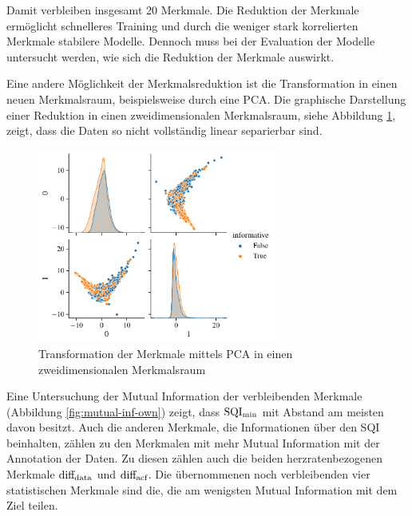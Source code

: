 Damit verbleiben insgesamt 20 Merkmale. Die Reduktion der Merkmale ermöglicht schnelleres Training und durch die weniger stark korrelierten Merkmale stabilere Modelle. Dennoch muss bei der Evaluation der Modelle untersucht werden, wie sich die Reduktion der Merkmale auswirkt.

Eine andere Möglichkeit der Merkmalsreduktion ist die Transformation in einen neuen Merkmalsraum, beispielsweise durch eine \ac{PCA}. Die graphische Darstellung einer Reduktion in einen zweidimensionalen Merkmalsraum, siehe Abbildung \ref{fig:pca-own-reduced}, zeigt, dass die Daten so nicht vollständig linear separierbar sind.

\begin{figure}[H] %
	\centering
	\includegraphics[width=0.7\textwidth]{pic/pca-own-reduced.pdf}
	\caption{Transformation der Merkmale mittels PCA in einen zweidimensionalen Merkmalsraum}
	\label{fig:pca-own-reduced}
\end{figure}

Eine Untersuchung der Mutual Information der verbleibenden Merkmale (Abbildung \ref{fig:mutual-inf-own}) zeigt, dass $\text{SQI}\textsubscript{min}$ mit Abstand am meisten davon besitzt. Auch die anderen Merkmale, die Informationen über den \ac{SQI} beinhalten, zählen zu den Merkmalen mit mehr Mutual Information mit der Annotation der Daten. Zu diesen zählen auch die beiden herzratenbezogenen Merkmale $\text{diff}\textsubscript{data}$ und $\text{diff}\textsubscript{acf}$. Die übernommenen noch verbleibenden vier statistischen Merkmale sind die, die am wenigsten Mutual Information mit dem Ziel teilen.

